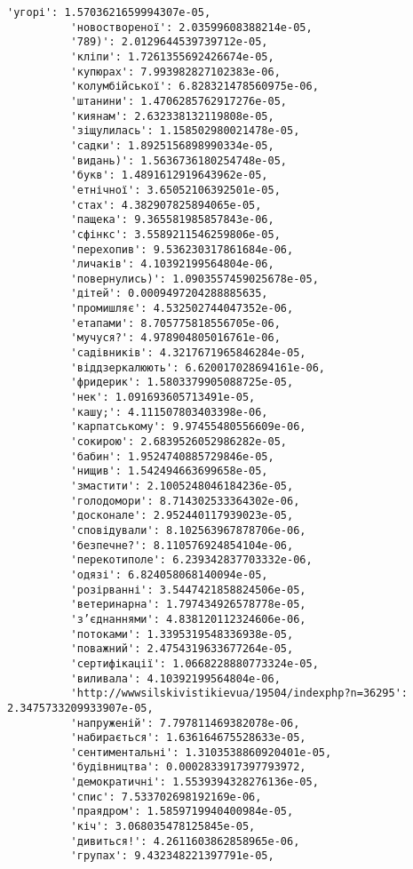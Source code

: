 \documentclass[11pt]{article}
\begin{document}
\begin{Verbatim}[commandchars=\\\{\}]
          'угорі': 1.5703621659994307e-05,
          'новоствореної': 2.03599608388214e-05,
          '789)': 2.0129644539739712e-05,
          'кліпи': 1.7261355692426674e-05,
          'купюрах': 7.993982827102383e-06,
          'колумбійської': 6.828321478560975e-06,
          'штанини': 1.4706285762917276e-05,
          'киянам': 2.632338132119808e-05,
          'зіщулилась': 1.158502980021478e-05,
          'садки': 1.8925156898990334e-05,
          'видань)': 1.5636736180254748e-05,
          'букв': 1.4891612919643962e-05,
          'етнічної': 3.65052106392501e-05,
          'стах': 4.382907825894065e-05,
          'пащека': 9.365581985857843e-06,
          'сфінкс': 3.5589211546259806e-05,
          'перехопив': 9.536230317861684e-06,
          'личаків': 4.10392199564804e-06,
          'повернулись)': 1.0903557459025678e-05,
          'дітей': 0.0009497204288885635,
          'промишляє': 4.532502744047352e-06,
          'етапами': 8.705775818556705e-06,
          'мучуся?': 4.978904805016761e-06,
          'садівників': 4.3217671965846284e-05,
          'віддзеркалюють': 6.620017028694161e-06,
          'фридерик': 1.5803379905088725e-05,
          'нек': 1.091693605713491e-05,
          'кашу;': 4.111507803403398e-06,
          'карпатському': 9.97455480556609e-06,
          'сокирою': 2.6839526052986282e-05,
          'бабин': 1.9524740885729846e-05,
          'нищив': 1.542494663699658e-05,
          'змастити': 2.1005248046184236e-05,
          'голодомори': 8.714302533364302e-06,
          'досконале': 2.952440117939023e-05,
          'сповідували': 8.102563967878706e-06,
          'безпечне?': 8.110576924854104e-06,
          'перекотиполе': 6.239342837703332e-06,
          'одязі': 6.824058068140094e-05,
          'розірванні': 3.5447421858824506e-05,
          'ветеринарна': 1.797434926578778e-05,
          'з’єднаннями': 4.838120112324606e-06,
          'потоками': 1.3395319548336938e-05,
          'поважний': 2.4754319633677264e-05,
          'сертифікації': 1.0668228880773324e-05,
          'виливала': 4.10392199564804e-06,
          'http://wwwsilskivistikievua/19504/indexphp?n=36295': 2.3475733209933907e-05,
          'напруженій': 7.797811469382078e-06,
          'набирається': 1.636164675528633e-05,
          'сентиментальні': 1.3103538860920401e-05,
          'будівництва': 0.0002833917397793972,
          'демократичні': 1.5539394328276136e-05,
          'спис': 7.533702698192169e-06,
          'праядром': 1.5859719940400984e-05,
          'кіч': 3.068035478125845e-05,
          'дивиться!': 4.2611603862858965e-06,
          'групах': 9.432348221397791e-05,

\end{Verbatim}
\end{document}
